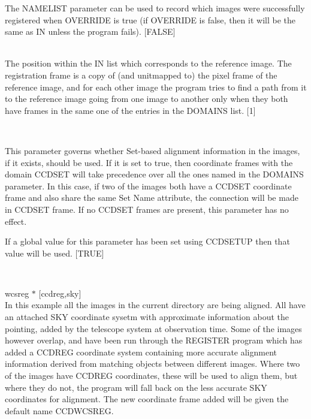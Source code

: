 \documentclass[twoside,11pt]{article}
\newcommand{\htmlref}[2]{#1}
\renewcommand{\_}{\texttt{\symbol{95}}}
\newcommand{\xroutine}[1]{\htmlref{{\sc #1}}{#1}}
\newcommand{\sstexamples}[1]{
   \item[Examples:] \mbox{} \\
   \vspace{-3.5ex}
   \begin{description}
      #1
   \end{description}
}
\newcommand{\sstsubsection}[1]{ \item[{#1}] \mbox{} \\}
\newcommand{\sstexamplesubsection}[2]{\sloppy \item{\ssttt #1} \mbox{} \\ #2 }
\newcommand{\sstexamples}[1]{
      \item[Examples:] \\
      \begin{description}
         #1
      \end{description}
      \\
   }
\newcommand{\sstsubsection}[1]{\item[{#1}]}
\newcommand{\sstexamplesubsection}[2]{\item[{\ssttt #1}] #2}
\begin{document}
{{{         The NAMELIST parameter can be used to record which images were
         successfully registered when OVERRIDE is true (if OVERRIDE is
         false, then it will be the same as IN unless the program fails).
         [FALSE]
      }
      \sstsubsection{ 
         REFPOS = \_INTEGER (Read)
      } {
         The position within the IN list which corresponds to the
         reference image.  The registration frame is a copy of (and
         unitmapped to) the pixel frame of the reference image,
         and for each other image the program tries to find a path from
         it to the reference image going from one image to another only
         when they both have frames in the same one of the entries in
         the DOMAINS list.
         [1]
      }
      \sstsubsection{
         USESET = \_LOGICAL (Read)
      } {
         This parameter governs whether Set-based alignment 
         information in the images, if it exists, should be used. 
         If it is set to true, then coordinate frames with the 
         domain CCD\_SET will take precedence over all the ones named 
         in the DOMAINS parameter.  In this case, if two of the images
         both have a CCD\_SET coordinate frame and also share the
         same Set Name attribute, the connection will be made in
         CCD\_SET frame.  If no CCD\_SET frames are present, this
         parameter has no effect.

         If a global value for this parameter has been set using 
         \xroutine{CCDSETUP} then that value will be used.
         [TRUE]
      }
   }
   \sstexamples{
      \sstexamplesubsection{
         wcsreg $*$ [ccd\_reg,sky]
      }{
         In this example all the images in the current directory are
         being aligned.  All have an attached SKY coordinate sysetm
         with approximate information about the pointing, added by the
         telescope system at observation time.  Some of the images
         however overlap, and have been run through the REGISTER
         program which has added a CCD\_REG coordinate system
         containing more accurate alignment information derived from
         matching objects between different images.  Where two of the
         images have CCD\_REG coordinates, these will be used to align
         them, but where they do not, the program will fall back on
         the less accurate SKY coordinates for alignment.  The new
         coordinate frame added will be given the default name
         CCD\_WCSREG.

}}}
\end{document}
